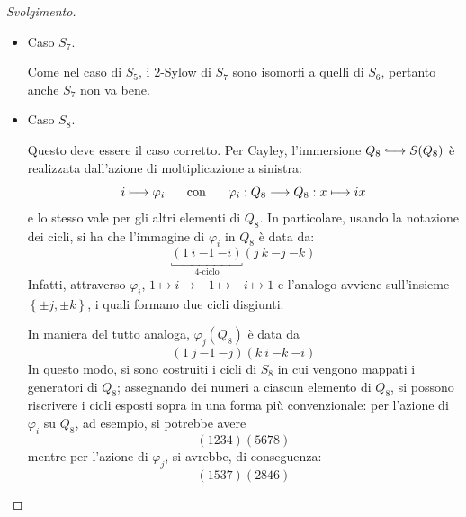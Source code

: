 \documentclass[11pt]{article}
\theoremstyle{style}
\newenvironment{svolgimento}{\renewcommand\qedsymbol{$\blacksquare$}\begin{proof}[Svolgimento]}{\end{proof}}
\numberwithin{equation}{subsection}
\newcommand{\longhookrightarrow}{\lhook\joinrel\longrightarrow}
\begin{document}
\begin{svolgimento}
\begin{itemize}
			Usando la proposizione \ref{qperm}, il fatto che $\sigma ^2 = \rho ^2 =\eta^2$ abbiano ordine $2$, cio\`e sono composte solo da trasposizioni, e che sono quadrati permette di concludere che si scrivono come il prodotto di trasposizioni; essendo in $S_6$, l'unica possibilit\`a \`e che
			\[
			\sigma ^2 = \rho ^2 = \eta^2 = (a\ b) ( c \ d)
			\] 
			perch\'e, in $S_6$, non esistono due coppie di trasposizioni tutte disgiunte.
			Ora si risolve $x^2 = (12)(34)$, che restituisce le seguenti possibilit\`a:
		\[
			\begin{array}{l l}
				x_1 = (1324)  &x_2 = (1423)\\
				x_3 = (1324)(56) & x_4 = (1423)(56)
			\end{array}
		\] 
		visto che la trasposizione $(56)$ scompare se elevata al quadrato.
		In questo modo, si vede che le soluzioni possibili sono $4$ in $S_6$, mentre in $Q_8$ se ne avevano $6$ di elementi di ordine $4$ con uguale quadrato.
	\item Caso $S_7$.

		Come nel caso di $S_5$, i $2$-Sylow di $S_7$ sono isomorfi a quelli di $S_6$, pertanto anche $S_7$ non va bene.
	\item Caso $S_8$.

		Questo deve essere il caso corretto.
		Per Cayley, l'immersione $Q_8 \longhookrightarrow S(Q_8)$ \`e realizzata dall'azione di moltiplicazione a sinistra:
		\[
		i\longmapsto \varphi _i \hspace{.5cm} \text{ con } \hspace{.5cm} \varphi _i : Q_8 \longrightarrow Q_8 : x \longmapsto ix
		\] 
		e lo stesso vale per gli altri elementi di $Q_8$.
		In particolare, usando la notazione dei cicli, si ha che l'immagine di $\varphi _i$ in $Q_8$ \`e data da:
		\[
		\underbracket{(1\ i \ {- 1}\ {- i} )}_{4\text{-ciclo}} (j\ k\ {-j}\ {-k})
		\] 
	Infatti, attraverso $\varphi _i$, $1\mapsto i \mapsto -1\mapsto -i\mapsto 1$ e l'analogo avviene sull'insieme $\left\{ \pm j, \pm k \right\} $, i quali formano due cicli disgiunti.

	In maniera del tutto analoga, $\varphi _j(Q_8)$ \`e data da
	\[
		(1\ j\ {-1}\ {-j})(k \ i \ {-k} \ {-i})
	\] 
	In questo modo, si sono costruiti i cicli di $S_8$ in cui vengono mappati i generatori di $Q_8$; assegnando dei numeri a ciascun elemento di $Q_8$, si possono riscrivere i cicli esposti sopra in una forma pi\`u convenzionale: per l'azione di $\varphi _i$ su $Q_8$, ad esempio, si potrebbe avere
	\[
		(1234)(5678)
	\] 
	mentre per l'azione di $\varphi _j$, si avrebbe, di conseguenza:
	\[
		(1537)(2846)
	\] 
	
	\end{itemize}
\end{svolgimento}
\end{document}
